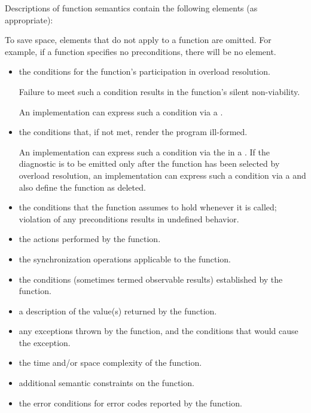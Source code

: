 \pnum
Descriptions of function semantics contain the following elements (as
appropriate):
\begin{footnote}
To save space, elements that do not apply to a function are omitted.
For example, if a function specifies no
preconditions, there will be no \expects element.
\end{footnote}
\begin{itemize}
\item
\constraints
the conditions for the function's participation
in overload resolution.
\begin{note}
Failure to meet such a condition results in the function's silent non-viability.
\end{note}
\begin{example}
An implementation can express such a condition
via a .
\end{example}

\item
\mandates
the conditions that, if not met, render the program ill-formed.
\begin{example}
An implementation can express such a condition
via the 
in a .
If the diagnostic is to be emitted only after the function
has been selected by overload resolution,
an implementation can express such a condition
via a 
and also define the function as deleted.
\end{example}

\item
\expects
the conditions
that the function assumes to hold whenever it is called;
violation of any preconditions results in undefined behavior.

\item
\effects
the actions performed by the function.

\item
\sync
the synchronization operations applicable to the function.

\item
\ensures
the conditions (sometimes termed observable results)
established by the function.

\item
\returns
a description of the value(s) returned by the function.

\item
\throws
any exceptions thrown by the function, and the conditions that would cause the exception.

\item
\complexity
the time and/or space complexity of the function.

\item
\remarks
additional semantic constraints on the function.

\item
\errors
the error conditions for error codes reported by the function.
\end{itemize}

